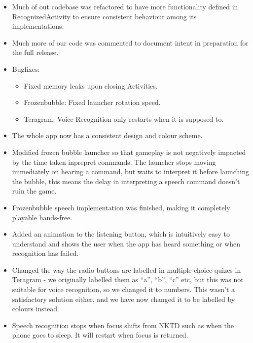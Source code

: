 \documentclass[11pt, oneside]{article}
\begin{document}
\begin{itemize}

\item Much of out codebase was refactored to have more functionality
  defined in RecognizedActivity to ensure consistent behaviour among
  its implementations.

\item Much more of our code was commented to document intent in
  preparation for the full release.

\item Bugfixes:
\begin{itemize}
	\item Fixed memory leaks upon closing Activities.
	\item Frozenbubble: Fixed launcher rotation speed.
	\item Teragram: Voice Recognition only restarts when it is
          supposed to.
\end{itemize}

\item The whole app now has a consistent design and colour scheme.

\item Modified frozen bubble launcher so that gameplay is not
  negatively impacted by the time taken inprepret commands. The
  launcher stops moving immediately on hearing a command, but waits to
  interpret it before launching the bubble, this means the delay in
  interpreting a speech command doesn't ruin the game.

\item Frozenbubble speech implementation was finished, making it
  completely playable hands-free.

\item Added an animation to the listening button, which is intuitively
  easy to understand and shows the user when the app has heard
  something or when recognition has failed.

\item Changed the way the radio buttons are labelled in multiple
  choice quizes in Teragram - we originally labelled them as ``a'',
  ``b'', ``c'' etc, but this was not suitable for voice recognition,
  so we changed it to numbers. This wasn't a satisfactory solution
  either, and we have now changed it to be labelled by colours
  instead.

\item Speech recognition stops when focus shifts from NKTD such as
  when the phone goes to sleep. It will restart when focus is returned.
\end{itemize}
\end{document}

